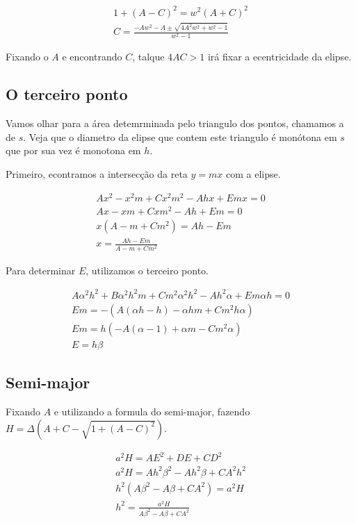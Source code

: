 \documentclass{article}
\begin{document}
	\begin{align*}
	1 + (A-C)^2 = w^2(A+C)^2\\
	C = \frac{-Aw^2 - A \pm \sqrt{4A^2w^2 + w^2 -1}}{w^2 - 1}
	\end{align*}
	
	Fixando o $A$ e encontrando $C$, talque $4AC > 1$ irá fixar a ecentricidade da elipse.
	
	\subsection{O terceiro ponto}
	
	Vamos olhar para a área detemrminada pelo triangulo dos pontos, chamamos a de $s$. Veja que o diametro da elipse que contem este triangulo é monótona em $s$ que por sua vez é monotona em $h$.
	
	Primeiro, econtramos a intersecção da reta $y=mx$ com a elipse.
	
	\begin{align*}
	Ax^2 -x^2m + Cx^2m^2 -Ahx + Emx = 0\\
	Ax -xm + Cxm^2 -Ah + Em = 0\\
	x(A-m + Cm^2) = Ah - Em\\
	x = \frac{Ah-Em}{A-m + Cm^2}
	\end{align*}
	
	Para determinar $E$, utilizamos o terceiro ponto.
	
	\begin{align*}
	A\alpha^2h^2 + B\alpha^2 h^2 m + Cm^2\alpha^2h^2 -Ah^2 \alpha + E m \alpha h = 0\\
	Em = -(	A(\alpha h - h) -\alpha hm + Cm^2h\alpha)\\
	Em = h(-A(\alpha  - 1) +\alpha m - Cm^2\alpha)\\
	E = h\beta
	\end{align*}
	
	
	\subsection{Semi-major}
	
	Fixando $A$ e utilizando a formula do semi-major, fazendo $H=\Delta(A + C - \sqrt{1 + (A-C)^2})$.
	
	\begin{align*}
	a^2 H = AE^2 + DE + CD^2\\
	a^2H = Ah^2\beta^2 -Ah^2\beta + CA^2h^2\\
	h^2(A\beta^2 - A\beta + CA^2) = a^2H\\
	h^2 = \frac{a^2H}{A\beta^2 - A\beta + CA^2}
	\end{align*}
	
\end{document}
